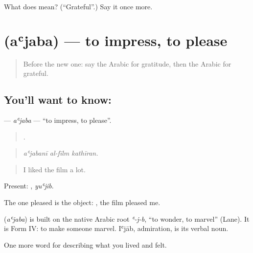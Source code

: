 \begin{tcolorbox}[breakable,colback=teal!4,colframe=teal!35!black,title={Before you move on}]
What does  mean? (\textquotedblleft{}Grateful\textquotedblright{}.) Say it once more.
\end{tcolorbox}
\section[\texorpdfstring{\ar{أعجب} (aʿjaba)}{أعجب (aʿjaba)}]{ (aʿjaba) — to impress, to please}

\label{lesson:AR-C491-ajaba}



\begin{quote}
Before the new one: say the Arabic for gratitude, then the Arabic for grateful.
\end{quote}

\subsection*{You'll want to know: }
\textbf{} — \emph{aʿjaba} — \textquotedblleft{}to impress, to please\textquotedblright{}.

\begin{quote}
  .
\end{quote}

\begin{quote}
\emph{aʿjabanī al-fīlm kathīran.}
\end{quote}

\begin{quote}
I liked the film a lot.
\end{quote}

Present: , \emph{yuʿjib}.

The one pleased is the object:  , the film pleased me.

\begin{cousinweb}
\textbf{} (\emph{aʿjaba}) is built on the native Arabic root \emph{ʿ-j-b}, \textquotedblleft{}to wonder, to marvel\textquotedblright{} (Lane). It is Form IV: to make someone marvel. Iʿjāb, admiration, is its verbal noun.
\end{cousinweb}

\begin{grammarlens}[title={What you've built}]
One more word for describing what you lived and felt.
\end{grammarlens}

